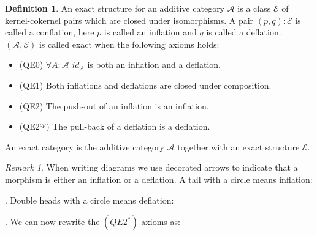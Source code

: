 \documentclass[11pt]{article}
\theoremstyle{definition}
\newtheorem{definition}{Definition}[section]
\theoremstyle{remark}
\newtheorem*{remark}{Remark}
\begin{document}
            \begin{definition}
                An exact structure for an additive category $\mathcal{A}$ is a class $\mathcal{E}$ of kernel-cokernel pairs which are closed under isomorphisms. A pair $(p,q):\mathcal{E}$ is called a conflation, here $p$ is called an inflation and $q$ is called a deflation. $(\mathcal{A},\mathcal{E})$ is called exact when the following axioms holds:
                \begin{itemize}
                    \item (QE0) $\forall A:\mathcal{A}$ $id_A$ is both an inflation and a deflation.
                    \item (QE1) Both inflations and deflations are closed under composition.
                    \item (QE2) The push-out of an inflation is an inflation.
                    \item (QE2$^{op}$) The pull-back of a deflation is a deflation.
                \end{itemize}

                An exact category is the additive category $\mathcal{A}$ together with an exact structure $\mathcal{E}$.
            \end{definition}


            \begin{remark}
                When writing diagrams we use decorated arrows to indicate that a morphism is either an inflation or a deflation. A tail with a circle means inflation: . Double heads with a circle means deflation: . We can now rewrite the $(QE2^*)$ axioms as:
                \begin{center}
                \end{center}
            \end{remark}
\end{document}
